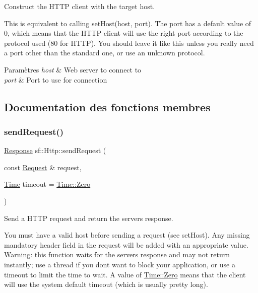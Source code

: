 Construct the H\+T\+TP client with the target host. 

This is equivalent to calling set\+Host(host, port). The port has a default value of 0, which means that the H\+T\+TP client will use the right port according to the protocol used (80 for H\+T\+TP). You should leave it like this unless you really need a port other than the standard one, or use an unknown protocol.


\begin{DoxyParams}{Paramètres}
{\em host} & Web server to connect to \\
\hline
{\em port} & Port to use for connection \\
\hline
\end{DoxyParams}


\subsection{Documentation des fonctions membres}
\mbox{\label{classsf_1_1Http_aaf09ebfb5e00dcc82e0d494d5c6a9e2a}} 
\subsubsection{\texorpdfstring{send\+Request()}{sendRequest()}}
{\footnotesize\ttfamily \hyperlink{classsf_1_1Http_1_1Response}{Response} sf\+::\+Http\+::send\+Request (\begin{DoxyParamCaption}\item[{const \hyperlink{classsf_1_1Http_1_1Request}{Request} \&}]{request,  }\item[{\hyperlink{classsf_1_1Time}{Time}}]{timeout = {\ttfamily \hyperlink{classsf_1_1Time_a8db127b632fa8da21550e7282af11fa0}{Time\+::\+Zero}} }\end{DoxyParamCaption})}



Send a H\+T\+TP request and return the server\textquotesingle{}s response. 

You must have a valid host before sending a request (see set\+Host). Any missing mandatory header field in the request will be added with an appropriate value. Warning\+: this function waits for the server\textquotesingle{}s response and may not return instantly; use a thread if you don\textquotesingle{}t want to block your application, or use a timeout to limit the time to wait. A value of \hyperlink{classsf_1_1Time_a8db127b632fa8da21550e7282af11fa0}{Time\+::\+Zero} means that the client will use the system default timeout (which is usually pretty long).


